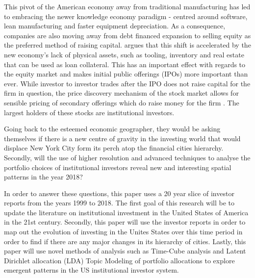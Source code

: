 This pivot of the American economy away from traditional manufacturing has led to embracing the newer knowledge economy paradigm - centred around software, lean manufacturing and faster equipment depreciation.  As a consequence, companies are also moving away from debt financed expansion to selling equity as the preferred method of raising capital. 	\cite{Graves2003} argues that this shift is accelerated by the new economy's lack of physical assets, such as tooling, inventory and real estate that can be used as loan collateral. This has an important effect with regards to the equity market and makes initial public offerings (IPOs) more important than ever. While investor to investor trades after the IPO does not raise capital for the firm in question, the price discovery mechanism of the stock market allows for sensible pricing of secondary offerings which do raise money for the firm \citep{Tobin1969}. The largest holders of these stocks are institutional investors.

Going back to the esteemed economic geographer, they would be asking themselves if there is a new centre of gravity in the investing world that would displace New York City form its perch atop the financial cities hierarchy.  Secondly, will the use of higher resolution and advanced techniques to analyse the portfolio choices of institutional investors reveal new and interesting spatial patterns in the year 2018?  

In order to answer these questions, this paper uses a 20 year slice of investor reports from the years 1999 to 2018.  The first goal of this research will be to update the literature on institutional investment in the United States of America in the 21st century.  Secondly, this paper will use the investor reports in order to map out the evolution of investing in the Unites States over this time period in order to find if there are any major changes in its hierarchy of cities.  Lastly, this paper will use novel methods of analysis such as Time-Cube analysis and Latent Dirichlet allocation (LDA) Topic Modeling of portfolio allocations to explore emergent patterns in the US institutional investor system.  